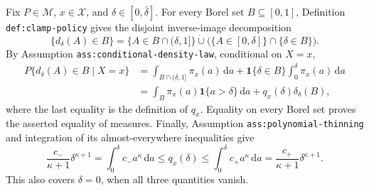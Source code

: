 Fix \(P\in\mathcal M\), \(x\in\mathcal X\), and \(\delta\in[0,\bar\delta]\).  For every Borel set \(B\subseteq[0,1]\), Definition \texttt{def:clamp-policy} gives the disjoint inverse-image decomposition
\[
 \{d_\delta(A)\in B\}
 =\{A\in B\cap(\delta,1]\}
   \mathbin{\dot\cup}
   \bigl(\{A\in[0,\delta]\}\cap\{\delta\in B\}\bigr).
\]
By Assumption \texttt{ass:conditional-density-law}, conditional on \(X=x\),
\[
 \begin{aligned}
 P\{d_\delta(A)\in B\mid X=x\}
 &=\int_{B\cap(\delta,1]}\pi_x(a)\,\mathrm da
   +\mathbf 1\{\delta\in B\}\int_0^\delta\pi_x(a)\,\mathrm da\\
 &=\int_B\pi_x(a)\mathbf 1\{a>\delta\}\,\mathrm da
   +q_x(\delta)\delta_\delta(B),
 \end{aligned}
\]
where the last equality is the definition of \(q_x\).  Equality on every Borel set proves the asserted equality of measures.  Finally, Assumption \texttt{ass:polynomial-thinning} and integration of its almost-everywhere inequalities give
\[
 \frac{c_-}{\kappa+1}\delta^{\kappa+1}
 =\int_0^\delta c_-a^\kappa\,\mathrm da
 \le q_x(\delta)
 \le\int_0^\delta c_+a^\kappa\,\mathrm da
 =\frac{c_+}{\kappa+1}\delta^{\kappa+1}.
\]
This also covers \(\delta=0\), when all three quantities vanish.